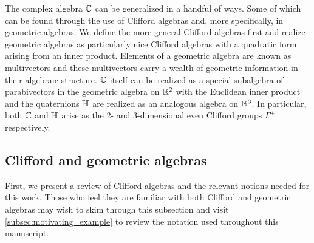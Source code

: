 The complex algebra $\mathbb{C}$ can be generalized in a handful of ways.  Some of which can be found through the use of Clifford algebras and, more specifically, in geometric algebras.  We define the more general Clifford algebras first and realize geometric algebras as particularly nice Clifford algebras with a quadratic form arising from an inner product. Elements of a geometric algebra are known as multivectors and these multivectors carry a wealth of geometric information in their algebraic structure. $\mathbb{C}$ itself can be realized as a special subalgebra of parabivectors in the geometric algebra on $\mathbb{R}^2$ with the Euclidean inner product and the quaternions $\mathbb{H}$ are realized as an analogous algebra on $\mathbb{R}^3$. In particular, both $\mathbb{C}$ and $\mathbb{H}$ arise as the 2- and 3-dimensional even Clifford groups $\Gamma^+$ respectively. 

\subsection{Clifford and geometric algebras}

First, we present a review of Clifford algebras and the relevant notions needed for this work. Those who feel they are familiar with both Clifford and geometric algebras may wish to skim through this subsection and visit \cref{subsec:motivating_example} to review the notation used throughout this manuscript. 

